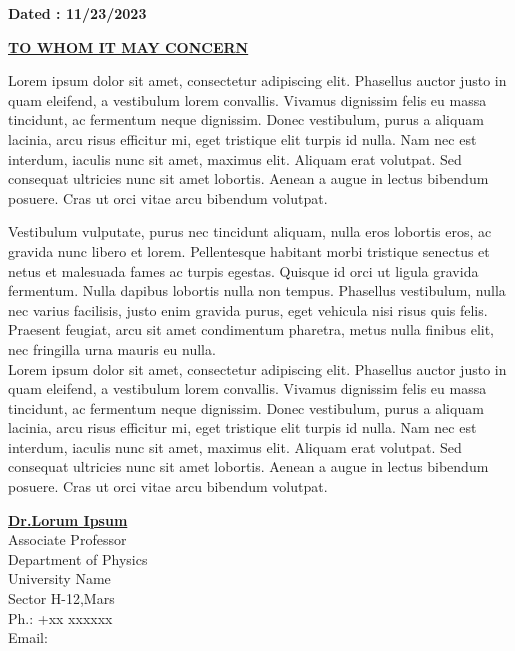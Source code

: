 \documentclass[12pt]{article}
\begin{document}
\begin{adjustwidth}{0.3in}{0.3in}
\begin{flushright}
\textbf{Dated : 11/23/2023}
\end{flushright}
\vspace*{0.11cm}
\begin{center}
\textbf{\underline{TO WHOM IT MAY CONCERN}}
\end{center}
\vspace*{0.2cm}
\onehalfspacing
 Lorem ipsum dolor sit amet, consectetur adipiscing elit. Phasellus auctor justo in quam eleifend, a vestibulum lorem convallis. Vivamus dignissim felis eu massa tincidunt, ac fermentum neque dignissim. Donec vestibulum, purus a aliquam lacinia, arcu risus efficitur mi, eget tristique elit turpis id nulla. Nam nec est interdum, iaculis nunc sit amet, maximus elit. Aliquam erat volutpat. Sed consequat ultricies nunc sit amet lobortis. Aenean a augue in lectus bibendum posuere. Cras ut orci vitae arcu bibendum volutpat.

Vestibulum vulputate, purus nec tincidunt aliquam, nulla eros lobortis eros, ac gravida nunc libero et lorem. Pellentesque habitant morbi tristique senectus et netus et malesuada fames ac turpis egestas. Quisque id orci ut ligula gravida fermentum. Nulla dapibus lobortis nulla non tempus. Phasellus vestibulum, nulla nec varius facilisis, justo enim gravida purus, eget vehicula nisi risus quis felis. Praesent feugiat, arcu sit amet condimentum pharetra, metus nulla finibus elit, nec fringilla urna mauris eu nulla. \\
 Lorem ipsum dolor sit amet, consectetur adipiscing elit. Phasellus auctor justo in quam eleifend, a vestibulum lorem convallis. Vivamus dignissim felis eu massa tincidunt, ac fermentum neque dignissim. Donec vestibulum, purus a aliquam lacinia, arcu risus efficitur mi, eget tristique elit turpis id nulla. Nam nec est interdum, iaculis nunc sit amet, maximus elit. Aliquam erat volutpat. Sed consequat ultricies nunc sit amet lobortis. Aenean a augue in lectus bibendum posuere. Cras ut orci vitae arcu bibendum volutpat.
\onehalfspacing
\vspace*{1.5cm}
\begin{flushright}
\textbf{\underline{Dr.Lorum Ipsum}} \\
Associate Professor \\
Department of Physics \\ 
University Name\\
Sector H-12,Mars \\
Ph.: +xx xxxxxx \\
Email: \\

\end{flushright}
\end{adjustwidth}
\end{document}
